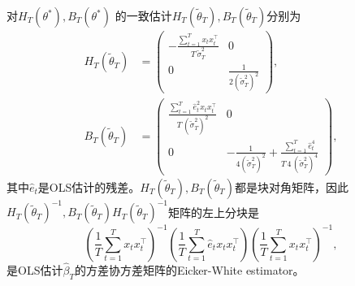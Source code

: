 对$H_{T} \left( \theta^{*} \right), B_{T} \left(\theta^{*} \right)$ 的一致估计$H_{T}\left( \tilde{\theta}_{T} \right), B_{T} \left(\tilde{\theta}_{T} \right)$分别为
\begin{equation*}
    \begin{split}
        H_{T}\left( \tilde{\theta}_{T} \right)
        & = \begin{pmatrix}
        - \frac{
        \sum_{t=1}^{T} x_{t} x_{t}^{\top}
        }{
        T \, \tilde{\sigma}_{T}^{2}
        } & 0 \\
        0 & \frac{1}{2 \left( \tilde{\sigma}_{T}^{2} \right)^{2}}
        \end{pmatrix}, \\
        B_{T} \left(\tilde{\theta}_{T} \right)
        & = \begin{pmatrix}
        \frac{
        \sum_{t=1}^{T} \hat{e}_{t}^{2} x_{t} x_{t}^{\top}
        }{
        T \, \left( \tilde{\sigma}_{T}^{2} \right)^{2}
        } & 0 \\
        0 &
        - \frac{1}{4 \left( \tilde{\sigma}_{T}^{2} \right)^{2}}
        + \frac{
        \sum_{t=1}^{T} \hat{e}_{t}^{4}
        }{
        T \, 4 \, \left( \tilde{\sigma}_{T}^{2} \right)^{4}
        }
        \end{pmatrix},
    \end{split}
\end{equation*}
其中$\hat{e}_{t}$是OLS估计的残差。$H_{T}\left( \tilde{\theta}_{T} \right), B_{T} \left(\tilde{\theta}_{T} \right)$都是块对角矩阵，因此$H_{T}\left( \tilde{\theta}_{T} \right)^{-1}, B_{T} \left(\tilde{\theta}_{T} \right) H_{T}\left( \tilde{\theta}_{T} \right)^{-1}$矩阵的左上分块是
\begin{equation*}
    \left( \frac{1}{T} \sum_{t=1}^{T} x_{t} x_{t}^{\top} \right)^{-1}
    \left( \frac{1}{T} \sum_{t=1}^{T} \hat{e}_{t} x_{t}x_{t}^{\top} \right)
    \left( \frac{1}{T} \sum_{t=1}^{T} x_{t} x_{t}^{\top} \right)^{-1},
\end{equation*}
是OLS估计$\hat{\beta}_{T}$的方差协方差矩阵的Eicker-White estimator。
